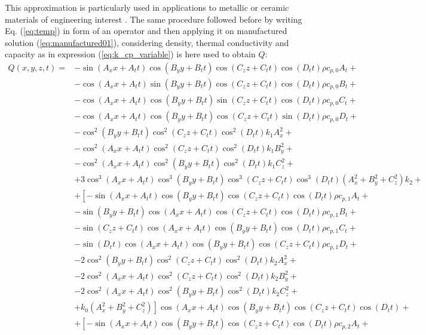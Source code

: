 \documentclass[a4paper,10pt]{article}
\begin{document}
This approximation is particularly used in applications to metallic or ceramic materials of engineering interest \cite{Kirk2009}. The same procedure followed before by writing Eq. (\ref{eq:temp}) in form of an operator and then applying 
it on manufactured solution (\ref{eq:manufactured01}), considering density, thermal conductivity and capacity as 
in expression (\ref{eq:k_cp_variable}) is here used to obtain $Q$:
\begin{equation}
\begin{split}
  Q(x,y,z,t) = &-\sin(A_x x+A_t t) \cos(B_y y+B_t t) \cos(C_z z+C_t t)  \cos(D_t t) \rho c_{p,0} A_t+\\
  &-\cos(A_x x+A_t t) \sin(B_y y+B_t t) \cos(C_z z+C_t t)  \cos(D_t t) \rho c_{p,0} B_t+\\
  &-\cos(A_x x+A_t t) \cos(B_y y+B_t t) \sin(C_z z+C_t t)  \cos(D_t t) \rho c_{p,0} C_t+\\
  &-\cos(A_x x+A_t t) \cos(B_y y+B_t t) \cos(C_z z+C_t t)  \sin(D_t t) \rho c_{p,0} D_t+\\
  &-\cos^2(B_y y+B_t t) \cos^2(C_z z+C_t t) \cos^2(D_t t) k_1 A_x^2+\\
  &-\cos^2(A_x x+A_t t) \cos^2(C_z z+C_t t) \cos^2(D_t t) k_1 B_y^2+\\
  &-\cos^2(A_x x+A_t t) \cos^2(B_y y+B_t t) \cos^2(D_t t) k_1 C_z^2+\\
  &+3 \cos^3(A_x x+A_t t)\cos^3(B_y y+B_t t) \cos^3(C_z z+C_t t) \cos^3(D_t t) (A_x^2+B_y^2+C_z^2) k_2+\\
  &+\left[-\sin(A_x x+A_t t) \cos(B_y y+B_t t) \cos(C_z z+C_t t)  \cos(D_t t) \rho c_{p,1} A_t+\right.\\
    &-\sin(B_y y+B_t t) \cos(A_x x+A_t t) \cos(C_z z+C_t t)  \cos(D_t t) \rho c_{p,1} B_t+\\
    &-\sin(C_z z+C_t t)  \cos(A_x x+A_t t) \cos(B_y y+B_t t) \cos(D_t t) \rho c_{p,1} C_t+\\
    &-\sin(D_t t) \cos(A_x x+A_t t) \cos(B_y y+B_t t) \cos(C_z z+C_t t)  \rho c_{p,1} D_t+\\
    &-2 \cos^2(B_y y+B_t t) \cos^2(C_z z+C_t t) \cos^2(D_t t) k_2 A_x^2+\\
    &-2 \cos^2(A_x x+A_t t) \cos^2(C_z z+C_t t) \cos^2(D_t t) k_2 B_y^2 +\\
    &-2 \cos^2(A_x x+A_t t) \cos^2(B_y y+B_t t) \cos^2(D_t t) k_2 C_z^2 +\\
    &\left.+k_0( A_x^2+ B_y^2+ C_z^2)\right] \cos(A_x x+A_t t) \cos(B_y y+B_t t) \cos(C_z z+C_t t)  \cos(D_t t)+\\
  &+\left[-\sin(A_x x+A_t t) \cos(B_y y+B_t t) \cos(C_z z+C_t t)  \cos(D_t t) \rho c_{p,2} A_t+\right.\\

\end{split}
\end{equation}
\end{document}
